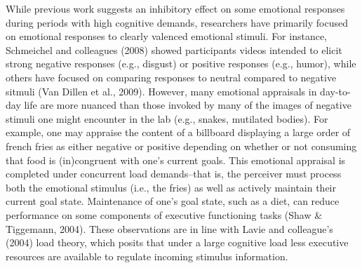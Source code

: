 \documentclass[man]{apa6}
\begin{document}
While previous work suggests an inhibitory effect on some emotional responses during periods with high cognitive demands, researchers have primarily focused on emotional responses to clearly valenced emotional stimuli. For instance, Schmeichel and colleagues (2008) showed participants videos intended to elicit strong negative responses (e.g., disgust) or positive responses (e.g., humor), while others have focused on comparing responses to neutral compared to negative sitmuli (Van Dillen et al., 2009). However, many emotional appraisals in day-to-day life are more nuanced than those invoked by many of the images of negative stimuli one might encounter in the lab (e.g., snakes, mutilated bodies). For example, one may appraise the content of a billboard displaying a large order of french fries as either negative or positive depending on whether or not consuming that food is (in)congruent with one's current goals. This emotional appraisal is completed under concurrent load demands--that is, the perceiver must process both the emotional stimulus (i.e., the fries) as well as actively maintain their current goal state. Maintenance of one's goal state, such as a diet, can reduce performance on some components of executive functioning tasks (Shaw \& Tiggemann, 2004). These observations are in line with Lavie and colleague's (2004) load theory, which posits that under a large cognitive load less executive resources are available to regulate incoming stimulus information.
\end{document}
